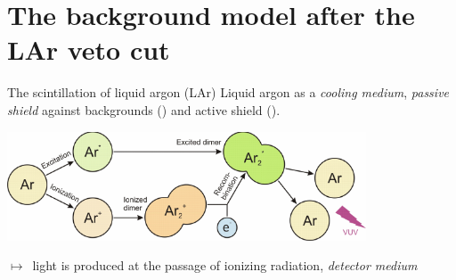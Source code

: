 \documentclass[10pt,aspectratio=169]{beamer}
\newcommand{\arrow}{$\longmapsto$}
\begin{document}
\section{The background model after the LAr veto cut}
\begin{frame}{The scintillation of liquid argon (LAr)}
  Liquid argon as a \emph{cooling medium}, \emph{passive shield} against
  backgrounds (\phaseone) and \alert{active shield} (\phasetwo).
  \begin{center}
    \includegraphics[width=0.8\textwidth]{lar-scint-mechanism.pdf}
  \end{center}
  \arrow\ light is produced at the passage of ionizing radiation,
  \emph{detector medium}
\end{frame}
\end{document}
